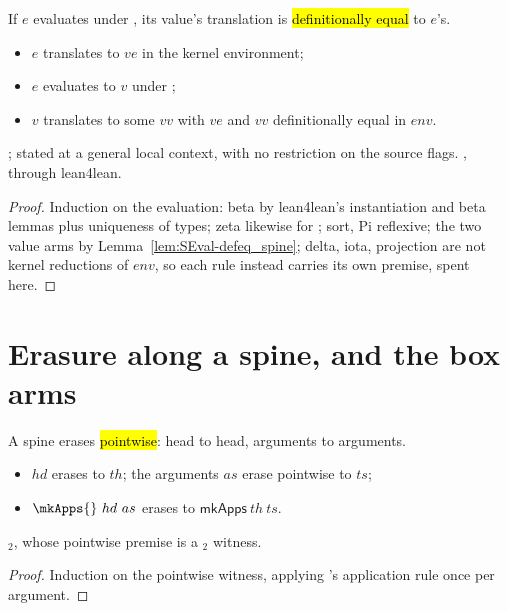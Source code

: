 \begin{theorem}
\label{thm:SEval-defeq}
\leanok
{}
 If $e$ evaluates under \SEval{}, its value's translation is \hl{definitionally equal} to
$e$'s.
\begin{itemize}
\item {} $e$ translates to $ve$ in the kernel environment;
\item $e$ evaluates to $v$ under \SEval{};
\item {} $v$ translates to some $vv$ with $ve$ and $vv$ definitionally equal in $env$.
\end{itemize}
 ; stated at a general local context, with no restriction on the source flags.
 \stProved{}, \stInherited{} through lean4lean.
\end{theorem}
\begin{proof}
\leanok
{}
 Induction on the evaluation: beta by lean4lean's instantiation and beta lemmas plus
uniqueness of types; zeta likewise for ; sort, Pi reflexive; the two value arms by
Lemma~\ref{lem:SEval-defeq_spine}; delta, iota, projection are not kernel reductions of $env$, so each
rule instead carries its own  premise, spent here.
\end{proof}

\section{Erasure along a spine, and the box arms}
\label{sec:correctness:box}

\begin{lemma}
\label{lem:Erases-mkApps_forall2}
\leanok
{}
 A spine erases \hl{pointwise}: head to head, arguments to arguments.
\begin{itemize}
\item {} $hd$ erases to $th$; the arguments $as$ erase pointwise to $ts$;
\item {} $\mkApps{}\ hd\ as$ erases to $\mathsf{mkApps}\ th\ ts$.
\end{itemize}
 $_2$, whose pointwise premise is a $_2$ witness.
\end{lemma}
\begin{proof}
\leanok
{}
 Induction on the pointwise witness, applying \Erases{}'s application rule once per argument.
\end{proof}

